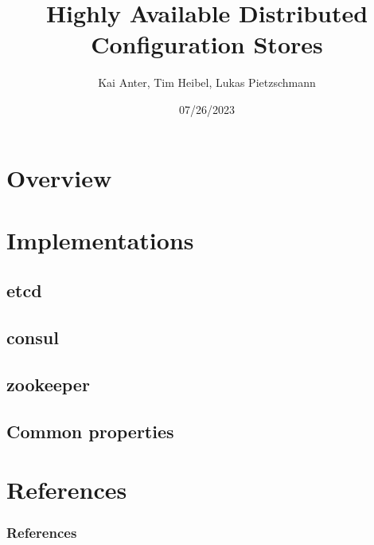 \documentclass[aspectratio=169, usepdftitle=false]{beamer}
\title[Distributed Config Stores]{Highly Available Distributed Configuration Stores}
\author[Kai, Tim, Lukas]{Kai Anter, Tim Heibel, Lukas Pietzschmann}
\subtitle{}
\institute{Institute of Distributed Systems}
\date{07/26/2023}
\begin{document}
\maketitle

\section{Overview}

\section{Implementations}

\subsection{etcd}


\subsection{consul}


\subsection{zookeeper}


\subsection{Common properties}

\section{References}
\begin{frame}[allowframebreaks]
	\frametitle{References}
	\printbibliography
\end{frame}
\end{document}
